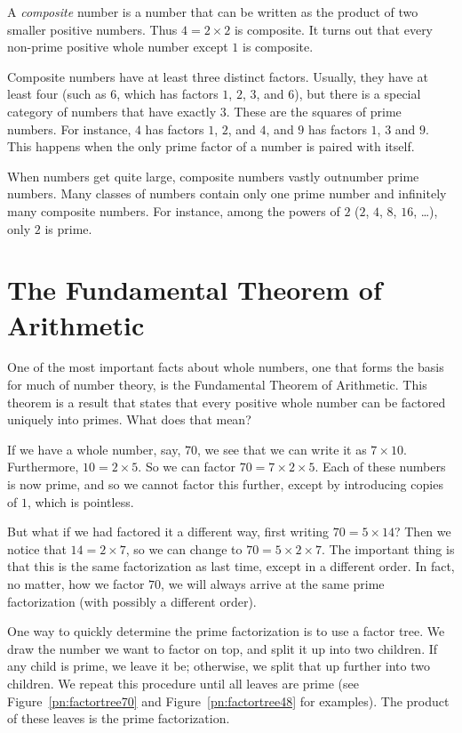 \documentclass[a4paper,10pt]{report}
\begin{document}
A \emph{composite} number is a number that can be written as the product of two
smaller positive numbers. Thus $4=2\times2$ is composite. It turns out that
every non-prime positive whole number except $1$ is composite.

Composite numbers have at least three distinct factors. Usually, they have at
least four (such as $6$, which has factors $1$, $2$, $3$, and $6$), but there is
a special category of numbers that have exactly $3$. These are the squares of
prime numbers. For instance, $4$ has factors $1$, $2$, and $4$, and $9$ has
factors $1$, $3$ and $9$. This happens when the only prime factor of a number is
paired with itself.

When numbers get quite large, composite numbers vastly outnumber prime numbers.
Many classes of numbers contain only one prime number and infinitely many
composite numbers. For instance, among the powers of $2$ ($2$, $4$, $8$, $16$,
\dots), only $2$ is prime.

\section{The Fundamental Theorem of Arithmetic}

One of the most important facts about whole numbers, one that forms the basis
for much of number theory, is the Fundamental Theorem of Arithmetic. This
theorem is a result that states that every positive whole number can be factored
uniquely into primes. What does that mean?

If we have a whole number, say, $70$, we see that we can write it as
$7\times10$. Furthermore, $10=2\times5$. So we can factor $70=7\times2\times5$.
Each of these numbers is now prime, and so we cannot factor this further, except
by introducing copies of $1$, which is pointless.

But what if we had factored it a different way, first writing $70=5\times14$?
Then we notice that $14=2\times7$, so we can change to $70=5\times2\times7$. The
important thing is that this is the same factorization as last time, except in a
different order. In fact, no matter, how we factor $70$, we will always arrive
at the same prime factorization (with possibly a different order).

One way to quickly determine the prime factorization is to use a factor tree. We
draw the number we want to factor on top, and split it up into two children. If
any child is prime, we leave it be; otherwise, we split that up further into two
children. We repeat this procedure until all leaves are prime (see
Figure~\ref{pn:factortree70} and Figure~\ref{pn:factortree48} for examples). The
product of these leaves is the prime factorization.
\end{document}
